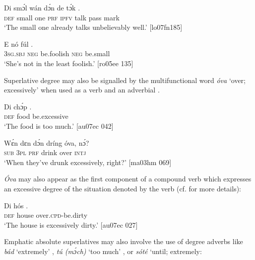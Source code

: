 \ea%
    \label{ex:key:491}
    \gll Di  smɔ́l  wán  dɔ́n  de  tɔ́k    .\\
\textsc{def}  small  one  \textsc{prf}  \textsc{ipfv}  talk  pass  mark\\

\glt ‘The small one already talks unbelievably well.’ [lo07fn185]
\z


\ea%
    \label{ex:key:492}
    \gll E    nó  fúl       .\\
\textsc{3sg.sbj}  \textsc{neg}  be.foolish  \textsc{neg}  be.small\\

\glt ‘She’s not in the least foolish.’ [ro05ee 135]
\z

Superlative degree may also be signalled by the multifunctional word \textit{óva} ‘over; excessively’ when used as a verb  and an adverbial . 


\ea%
    \label{ex:key:493}
    \gll Di  chɔ́p  .\\
\textsc{def}  food    be.excessive\\

\glt ‘The food is too much.’ [au07ec 042]
\z


\ea%
    \label{ex:key:494}
    \gll Wɛ́n    dɛn  dɔ́n  dríng  óva,    nɔ́?\\
\textsc{sub}    \textsc{3pl}  \textsc{prf}  drink  over    \textsc{intj}\\

\glt ‘When they’ve drunk excessively, right?’ [ma03hm 069]
\z

\textit{\'{O}va} may also appear as the first component of a compound verb which expresses an excessive degree of the situation denoted by the verb (cf.  for more details):


\ea%
    \label{ex:key:495}
    \gll Di  hós    .\\
\textsc{def}  house  over.\textsc{cpd}{}-be.dirty\\

\glt ‘The house is excessively dirty.’ [au07ec 027]
\z

Emphatic absolute superlatives may also involve the use of degree adverbs like \textit{bád} ‘extremely’ , \textit{tú (mɔ́ch)} ‘too much’\textit{} , or \textit{sóté} ‘until; extremely:


